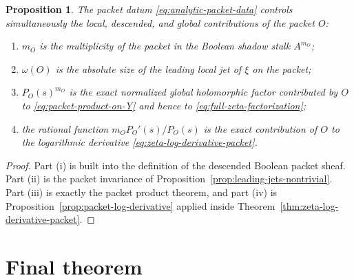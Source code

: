 \documentclass[11pt,a4paper]{article}
\newtheorem{proposition}[theorem]{Proposition}
\theoremstyle{definition}
\theoremstyle{remark}
\begin{document}
\begin{proposition}\label{prop:analytic-packet-data-complete}
The packet datum \eqref{eq:analytic-packet-data} controls simultaneously the local, descended, and global contributions of the packet $O$:
\begin{enumerate}[label=(\roman*)]
\item $m_O$ is the multiplicity of the packet in the Boolean shadow stalk $A^{m_O}$;
\item $\omega(O)$ is the absolute size of the leading local jet of $\xi$ on the packet;
\item $P_O(s)^{m_O}$ is the exact normalized global holomorphic factor contributed by $O$ to \eqref{eq:packet-product-on-Y} and hence to \eqref{eq:full-zeta-factorization};
\item the rational function $m_O P_O'(s)/P_O(s)$ is the exact contribution of $O$ to the logarithmic derivative \eqref{eq:zeta-log-derivative-packet}.
\end{enumerate}
\end{proposition}

\begin{proof}
Part (i) is built into the definition of the descended Boolean packet sheaf.  Part (ii) is the packet invariance of Proposition~\ref{prop:leading-jets-nontrivial}.  Part (iii) is exactly the packet product theorem, and part (iv) is Proposition~\ref{prop:packet-log-derivative} applied inside Theorem~\ref{thm:zeta-log-derivative-packet}.
\end{proof}

\section{Final theorem}
\end{document}
